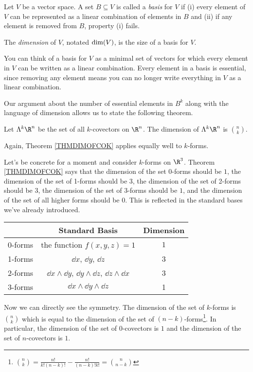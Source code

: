 \begin{definition}
	Let $V$ be a vector space.
	A set $B\subseteq V$ is called a \emph{basis} for $V$
	if (i) every element of $V$ can be represented as a linear combination
	of elements in $B$ and (ii) if any element is removed from $B$, property (i)
	fails.

	The \emph{dimension} of $V$, notated $\operatorname{dim}(V)$, is the size of a basis for
	$V$.
\end{definition}
You can think of a basis for $V$ as a minimal set of vectors for which every element
in $V$ can be written as a linear combination.  Every element in a basis is essential,
since removing any element means you can no longer write everything in $V$ as a 
linear combination.

Our argument about the number of essential elements in $B^k$ along with the language
of dimension allows us to state the following theorem.

\begin{theorem}
	\label{THMDIMOFCOK}
	Let $\Lambda^k\R^n$ be the set of all $k$-covectors on $\R^n$.
	The dimension of $\Lambda^k\R^n$ is $\binom{n}{k}$.
\end{theorem}
Again, Theorem \ref{THMDIMOFCOK} applies equally well to $k$-forms.

Let's be concrete for a moment and consider $k$-forms on $\R^3$.  Theorem \ref{THMDIMOFCOK}
says that the dimension of the set 0-forms should be $1$, the dimension of the
set of 1-forms should be $3$, the dimension of the set of 2-forms should be $3$,
the dimension of the set of 3-forms should be $1$, and the dimension of the set
of all higher forms should be $0$.  This is reflected in the standard bases we've 
already introduced.

\begin{center}
	\begin{tabular}{c|c|c}
	&Standard Basis & Dimension\\
	\hline
	0-forms & the function $f(x,y,z)=1$ & $1$\\
	1-forms & $\dd x$, $\dd y$, $\dd z$ & 3\\
	2-forms & $\dd x\wedge \dd y$, $\dd y\wedge \dd z$, $\dd z\wedge \dd x$ & 3\\
	3-forms & $\dd x\wedge \dd y\wedge \dd z$ & 1
	\end{tabular}
\end{center}

Now we can directly see the symmetry.  The dimension of the set
of $k$-forms is $\binom{n}{k}$ which is equal to the dimension of the
set of $(n-k)$-forms\footnote{
	$\binom{n}{k} = \frac{n!}{k!(n-k)!} - \frac{n!}{(n-k)!k!} = \binom{n}{n-k}$
}. In particular, the dimension of the set of 0-covectors is $1$ and the dimension
of the set of $n$-covectors is $1$.

